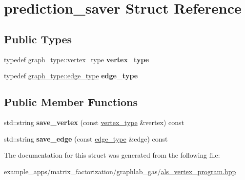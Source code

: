 \hypertarget{structprediction__saver}{\section{prediction\-\_\-saver Struct Reference}
\label{structprediction__saver}
}
\subsection*{Public Types}
\begin{DoxyCompactItemize}
\item 
\hypertarget{structprediction__saver_aeb6641db876dbe584d00eac7e3035107}{typedef \hyperlink{structgraphlab_1_1_graph_lab_vertex_wrapper}{graph\-\_\-type\-::vertex\-\_\-type} {\bfseries vertex\-\_\-type}}\label{structprediction__saver_aeb6641db876dbe584d00eac7e3035107}

\item 
\hypertarget{structprediction__saver_ab3d21e3919d539d70ee9a08affd672be}{typedef \hyperlink{structgraphlab_1_1_graph_lab_edge_wrapper}{graph\-\_\-type\-::edge\-\_\-type} {\bfseries edge\-\_\-type}}\label{structprediction__saver_ab3d21e3919d539d70ee9a08affd672be}

\end{DoxyCompactItemize}
\subsection*{Public Member Functions}
\begin{DoxyCompactItemize}
\item 
\hypertarget{structprediction__saver_ac3f39b9cfbd98608ce12e9e08770decd}{std\-::string {\bfseries save\-\_\-vertex} (const \hyperlink{structgraphlab_1_1_graph_lab_vertex_wrapper}{vertex\-\_\-type} \&vertex) const }\label{structprediction__saver_ac3f39b9cfbd98608ce12e9e08770decd}

\item 
\hypertarget{structprediction__saver_aeaaae219884dfa49b551ea07db8b9447}{std\-::string {\bfseries save\-\_\-edge} (const \hyperlink{structgraphlab_1_1_graph_lab_edge_wrapper}{edge\-\_\-type} \&edge) const }\label{structprediction__saver_aeaaae219884dfa49b551ea07db8b9447}

\end{DoxyCompactItemize}


The documentation for this struct was generated from the following file\-:\begin{DoxyCompactItemize}
\item 
example\-\_\-apps/matrix\-\_\-factorization/graphlab\-\_\-gas/\hyperlink{als__vertex__program_8hpp}{als\-\_\-vertex\-\_\-program.\-hpp}\end{DoxyCompactItemize}
